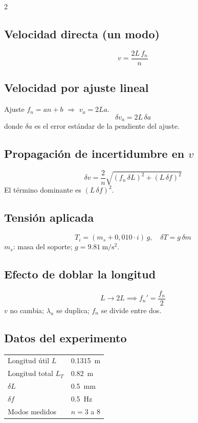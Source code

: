 \documentclass[10pt,a4paper]{article}
\begin{document}
\begin{multicols}{2}
\subsection*{Velocidad directa (un modo)}
\begin{equation*}
  v = \frac{2L\,f_n}{n}
\end{equation*}

\subsection*{Velocidad por ajuste lineal}
Ajuste $f_n = an + b$ $\Rightarrow$ $v_a = 2La$.
\begin{equation*}
  \delta v_a = 2L\,\delta a
\end{equation*}
donde $\delta a$ es el error estándar de la pendiente del ajuste.

\subsection*{Propagación de incertidumbre en $v$}
\begin{equation*}
  \delta v = \frac{2}{n}\sqrt{(f_n\,\delta L)^2 + (L\,\delta f)^2}
\end{equation*}
El término dominante es $(L\,\delta f)^2$.

\subsection*{Tensión aplicada}
\begin{equation*}
  T_i = (m_s + 0{,}010\cdot i)\,g, \quad \delta T = g\,\delta m
\end{equation*}
$m_s$: masa del soporte; $g = \SI{9.81}{\m\per\s\squared}$.

\subsection*{Efecto de doblar la longitud}
\begin{equation*}
  L \to 2L \implies f_n' = \frac{f_n}{2}
\end{equation*}
$v$ no cambia; $\lambda_n$ se duplica; $f_n$ se divide entre dos.

\subsection*{Datos del experimento}
\begin{center}
  \small
  \begin{tabular}{ll}
    \toprule
    Longitud útil $L$   & \SI{0.1315}{\m} \\
    Longitud total $L_T$& \SI{0.82}{\m}   \\
    $\delta L$          & \SI{0.5}{\mm}   \\
    $\delta f$          & \SI{0.5}{\Hz}   \\
    Modos medidos       & $n = 3$ a $8$   \\
    \bottomrule
  \end{tabular}
\end{center}


\end{multicols}
\end{document}
